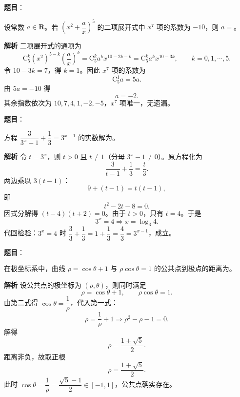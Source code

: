 \begin{answer}

\textbf{题目}：

设常数 $a\in\mathbf R$。若 $\left(x^2+\dfrac ax\right)^5$ 的二项展开式中 $x^7$ 项的系数为 $-10$，则 $a=$\gkblank{}。

\textbf{解析}
二项展开式的通项为
\nopagebreak[4]
\[\mathrm C_5^k\left(x^2\right)^{5-k}\left(\frac ax\right)^k
=\mathrm C_5^k a^k x^{10-2k-k}
=\mathrm C_5^k a^k x^{10-3k},\qquad k=0,1,\cdots,5.\]
令 $10-3k=7$，得 $k=1$。因此 $x^7$ 项的系数为
\nopagebreak[4]
\[\mathrm C_5^1a=5a.\]
由 $5a=-10$ 得
\nopagebreak[4]
\[a=-2.\]
其余指数依次为 $10,7,4,1,-2,-5$，$x^7$ 项唯一，无遗漏。


\end{answer}
\begin{answer}

\textbf{题目}：

方程 $\dfrac{3}{3^x-1}+\dfrac13=3^{x-1}$ 的实数解为\gkblank{}。

\textbf{解析}
令 $t=3^x$，则 $t>0$ 且 $t\neq1$（分母 $3^x-1\neq0$）。原方程化为
\nopagebreak[4]
\[\frac{3}{t-1}+\frac13=\frac t3.\]
两边乘以 $3(t-1)$：
\nopagebreak[4]
\[9+(t-1)=t(t-1),\]
即
\nopagebreak[4]
\[t^2-2t-8=0.\]
因式分解得 $(t-4)(t+2)=0$。由于 $t>0$，只有 $t=4$。于是
\nopagebreak[4]
\[3^x=4\Longrightarrow x=\log_3 4.\]
代回检验：$3^x=4$ 时 $\dfrac{3}{3}+\dfrac13=1+\dfrac13=\dfrac43=3^{x-1}$，成立。


\end{answer}
\begin{answer}

\textbf{题目}：

在极坐标系中，曲线 $\rho=\cos\theta+1$ 与 $\rho\cos\theta=1$ 的公共点到极点的距离为\gkblank{}。

\textbf{解析}
设公共点的极坐标为 $(\rho,\theta)$，则同时满足
\nopagebreak[4]
\[\rho=\cos\theta+1,\qquad \rho\cos\theta=1.\]
由第二式得 $\cos\theta=\dfrac1\rho$，代入第一式：
\nopagebreak[4]
\[\rho=\frac1\rho+1\Longrightarrow \rho^2-\rho-1=0.\]
解得
\nopagebreak[4]
\[\rho=\frac{1\pm\sqrt5}{2}.\]
距离非负，故取正根
\nopagebreak[4]
\[\rho=\frac{1+\sqrt5}{2}.\]
此时 $\cos\theta=\dfrac1\rho=\dfrac{\sqrt5-1}{2}\in[-1,1]$，公共点确实存在。


\end{answer}
